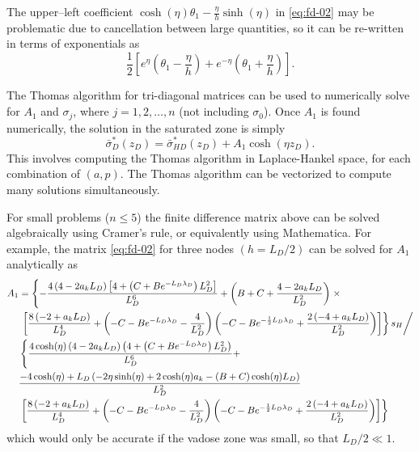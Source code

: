 \documentclass[12pt,letterpaper]{article}
\begin{document}
The upper--left coefficient $\cosh(\eta)\theta_1 -
\frac{\eta}{h}\sinh(\eta)$ in \eqref{eq:fd-02} may be problematic due
to cancellation between large quantities, so it can be re-written in
terms of exponentials as
\begin{equation}
 \nonumber
 \frac{1}{2} \left[ e^{\eta} \left( \theta_1 - \frac{\eta}{h}\right) + e^{-\eta}
   \left( \theta_1 + \frac{\eta}{h}\right) \right].
\end{equation}

The Thomas algorithm for tri-diagonal matrices can be used to
numerically solve for $A_1$ and $\sigma_j$, where $j=1,2, \dots, n$
(not including $\sigma_0$).  Once $A_1$ is found numerically, the
solution in the saturated zone is simply
\begin{equation}
 \nonumber
 \bar{\sigma}^{\ast}_{D}(z_D) = \bar{\sigma}^{\ast}_{HD}(z_D) + A_1
 \cosh(\eta z_D).
\end{equation}
This involves computing the Thomas algorithm in Laplace-Hankel space,
for each combination of $(a,p)$.  The Thomas algorithm can be
vectorized to compute many solutions simultaneously.

For small problems ($n \le 5$) the finite difference matrix above can
be solved algebraically using Cramer's rule, or equivalently using
Mathematica.  For example, the matrix \eqref{eq:fd-02} for three nodes
$(h=L_D/2)$ can be solved for $A_1$ analytically as
\begin{align}
  \label{eq:AsolnMathematica}
  A_1&=\left\lbrace-\frac{4 \left(4-2 a_k L_D\right) \left[4+\left(C+B e^{-L_D \lambda _D}\right) L_D^2\right]}{L_D^6}+\left(B+C+\frac{4-2 a_k L_D}{L_D^2}\right) \right.  \times \notag\\
      & \left.\left.\left[\frac{8 \left(-2+a_k L_D\right)}{L_D^4}+\left(-C-B e^{-L_D \lambda _D}-\frac{4}{L_D^2}\right) \left(-C-B e^{-\frac{1}{2} L_D \lambda _D}+\frac{2 \left(-4+a_k L_D\right)}{L_D^2}\right)\right]\right\rbrace s_H \right/\notag\\
  &\left\lbrace\frac{4 \cosh(\eta) \left(4-2 a_k L_D\right) \left(4+\left(C+B e^{-L_D \lambda _D}\right) L_D^2\right)}{L_D^6}+\right. \\
    &\frac{-4 \cosh(\eta)+L_D \left(-2 \eta  \sinh(\eta)+2 \cosh(\eta) a_k-(B+C) \cosh(\eta) L_D\right)}{L_D^2} \notag\\
    &\left.\left[\frac{8 \left(-2+a_k L_D\right)}{L_D^4}+\left(-C-B e^{-L_D \lambda _D}-\frac{4}{L_D^2}\right) \left(-C-B e^{-\frac{1}{2} L_D \lambda _D}+\frac{2 \left(-4+a_k L_D\right)}{L_D^2}\right)\right]\right\rbrace \notag
\end{align}
which would only be accurate if the vadose zone was small, so that
$L_D/2 \ll 1$.



\end{document}
